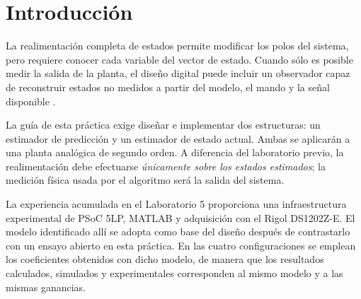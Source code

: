 \section{Introducción}
La realimentación completa de estados permite modificar los polos del sistema,
pero requiere conocer cada variable del vector de estado. Cuando sólo es posible
medir la salida de la planta, el diseño digital puede incluir un observador
capaz de reconstruir estados no medidos a partir del modelo, el mando y la
señal disponible \cite{samanta2024,fadali2020,astrom2020}.

La guía de esta práctica exige diseñar e implementar dos estructuras: un
estimador de predicción y un estimador de estado actual. Ambas se aplicarán a
una planta analógica de segundo orden. A diferencia del laboratorio previo,
la realimentación debe efectuarse \emph{únicamente sobre los estados estimados};
la medición física usada por el algoritmo será la salida del sistema.

La experiencia acumulada en el Laboratorio 5 proporciona una infraestructura
experimental de PSoC 5LP, MATLAB y adquisición con el Rigol DS1202Z-E. El
modelo identificado allí se adopta como base del diseño después de
contrastarlo con un ensayo abierto en esta práctica. En las cuatro
configuraciones se emplean los coeficientes obtenidos con dicho modelo, de manera que
los resultados calculados, simulados y experimentales corresponden al mismo
modelo y a las mismas ganancias.
